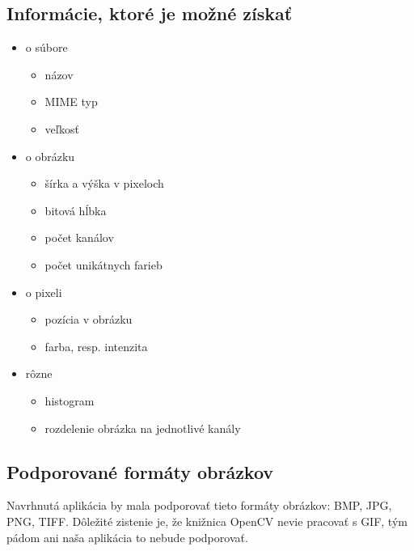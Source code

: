 \subsection{Informácie, ktoré je možné získať}
\begin{itemize}
	\item o súbore
	\begin{itemize}
		\item názov
		\item MIME typ
		\item veľkosť
	\end{itemize}
	\item o obrázku
	\begin{itemize}
		\item šírka a výška v pixeloch
		\item bitová hĺbka
		\item počet kanálov
		\item počet unikátnych farieb
	\end{itemize}
	\item o pixeli
	\begin{itemize}
		\item pozícia v obrázku
		\item farba, resp. intenzita
	\end{itemize}
	\item rôzne
	\begin{itemize}
		\item histogram
		\item rozdelenie obrázka na jednotlivé kanály
	\end{itemize}
\end{itemize}

\subsection{Podporované formáty obrázkov}
Navrhnutá aplikácia by mala podporovať tieto formáty obrázkov: BMP, JPG, PNG, TIFF. Dôležité zistenie je, že knižnica OpenCV nevie pracovať s GIF, tým pádom ani naša aplikácia to nebude podporovať.